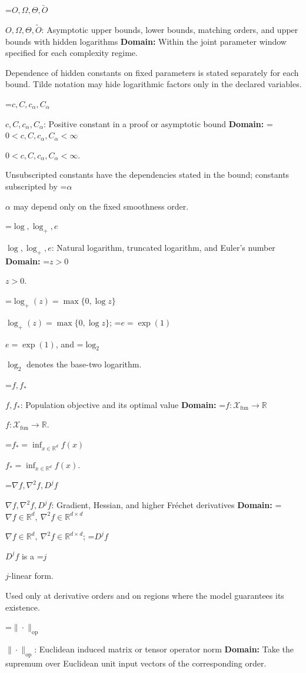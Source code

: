 \documentclass[10pt,a4paper]{article}
\newcommand{\AtlasMath}[1]{\par\begingroup\centering\setbox0=\hbox{$\displaystyle #1$}\ifdim\wd0>1.4\linewidth\typeout{ATLAS WIDE FORMULA: \the\wd0}\fi\ifdim\wd0>\linewidth\resizebox{\linewidth}{!}{\box0}\else\box0\fi\par\endgroup}
\newcommand{\AtlasInlineMath}[1]{\begingroup\setbox0=\hbox{$#1$}\ifdim\wd0>.4\linewidth\endgroup\AtlasMath{#1}\else\endgroup$#1$\fi}
\begin{document}
\AtlasInlineMath{O,\Omega,\Theta,\widetilde{O}}: Asymptotic upper bounds, lower bounds, matching orders, and upper bounds with hidden logarithms \textbf{Domain:} Within the joint parameter window specified for each complexity regime.



Dependence of hidden constants on fixed parameters is stated separately for each bound. Tilde notation may hide logarithmic factors only in the declared variables.



\AtlasInlineMath{c,C,c_\alpha,C_\alpha}: Positive constant in a proof or asymptotic bound \textbf{Domain:} \AtlasInlineMath{0<c,C,c_\alpha,C_\alpha<\infty}.



Unsubscripted constants have the dependencies stated in the bound; constants subscripted by \AtlasInlineMath{\alpha} may depend only on the fixed smoothness order.



\AtlasInlineMath{\log,\log_+,e}: Natural logarithm, truncated logarithm, and Euler's number \textbf{Domain:} \AtlasInlineMath{z>0}.



\AtlasInlineMath{\log_+(z)=\max\{0,\log z\}}; \AtlasInlineMath{e=\exp(1)}, and \AtlasInlineMath{\log_2} denotes the base-two logarithm.



\AtlasInlineMath{f,f_*}: Population objective and its optimal value \textbf{Domain:} \AtlasInlineMath{f:\mathcal{X}_{\mathrm{fun}}\to\mathbb{R}}.



\AtlasInlineMath{f_*=\inf_{x\in \mathbb{R}^d}f(x)}.



\AtlasInlineMath{\nabla f,\nabla^2f,D^jf}: Gradient, Hessian, and higher Fréchet derivatives \textbf{Domain:} \AtlasInlineMath{\nabla f\in\mathbb{R}^d,\ \nabla^2f\in\mathbb{R}^{d\times d}}; \AtlasInlineMath{D^jf} is a \AtlasInlineMath{j}-linear form.



Used only at derivative orders and on regions where the model guarantees its existence.



\AtlasInlineMath{\|\cdot\|_{\mathrm{op}}}: Euclidean induced matrix or tensor operator norm \textbf{Domain:} Take the supremum over Euclidean unit input vectors of the corresponding order.
\end{document}
